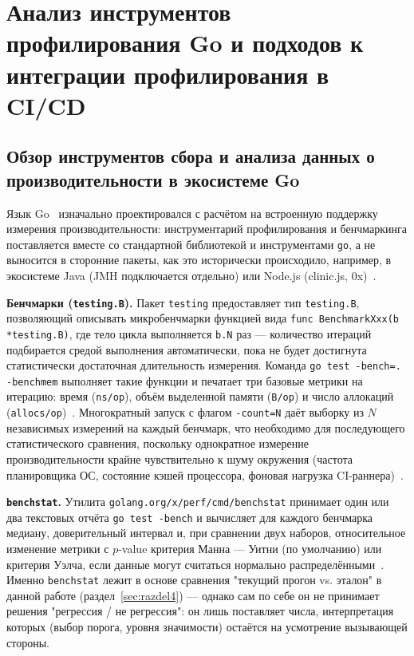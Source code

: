 \documentclass[12pt,a4paper]{article}
\newcommand{\newrazdel}{\clearpage}
\numberwithin{equation}{section}
\begin{document}
\newrazdel
\section{Анализ инструментов профилирования Go и подходов к интеграции профилирования в CI/CD}
\label{sec:razdel1}

\subsection{Обзор инструментов сбора и анализа данных о производительности в экосистеме Go}
\label{sec:1.1}

Язык Go~\cite{go-spec} изначально проектировался с расчётом на встроенную
поддержку измерения производительности: инструментарий профилирования и
бенчмаркинга поставляется вместе со стандартной библиотекой и
инструментами \texttt{go}, а не выносится в сторонние пакеты, как это
исторически происходило, например, в экосистеме Java (JMH подключается
отдельно) или Node.js (clinic.js, 0x)~\cite{donovan-kernighan}.

\textbf{Бенчмарки (\texttt{testing.B}).} Пакет \texttt{testing} предоставляет тип
\texttt{testing.B}, позволяющий описывать микробенчмарки функцией вида
\texttt{func BenchmarkXxx(b *testing.B)}, где тело цикла выполняется \texttt{b.N}
раз — количество итераций подбирается средой выполнения автоматически, пока не
будет достигнута статистически достаточная длительность измерения. Команда
\texttt{go test -bench=. -benchmem} выполняет такие функции и печатает три базовые
метрики на итерацию: время (\texttt{ns/\allowbreak op}), объём выделенной памяти
(\texttt{B/\allowbreak op}) и число аллокаций (\texttt{allocs/\allowbreak op})~\cite{go-testing-doc}.
Многократный запуск с флагом \texttt{-count=N} даёт выборку из $N$ независимых
измерений на каждый бенчмарк, что необходимо для последующего статистического
сравнения, поскольку однократное измерение производительности крайне
чувствительно к шуму окружения (частота планировщика ОС, состояние кэшей
процессора, фоновая нагрузка CI-раннера)~\cite{georges2007,mytkowicz2009}.

\textbf{\texttt{benchstat}.} Утилита \texttt{golang.org/\allowbreak x/\allowbreak perf/\allowbreak cmd/\allowbreak benchstat}
принимает один или два текстовых отчёта \texttt{go test -bench} и вычисляет
для каждого бенчмарка медиану, доверительный интервал и, при сравнении двух
наборов, относительное изменение метрики с $p$-value критерия
Манна --- Уитни (по умолчанию) или критерия Уэлча, если данные могут считаться
нормально распределёнными~\cite{benchstat-doc,welch1947}. Именно
\texttt{benchstat} лежит в основе сравнения "текущий прогон vs. эталон" в
данной работе (раздел~\ref{sec:razdel4}) — однако сам по себе он не принимает
решения "регрессия / не регрессия": он лишь поставляет числа, интерпретация
которых (выбор порога, уровня значимости) остаётся на усмотрение вызывающей
стороны.
\end{document}
